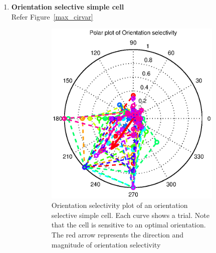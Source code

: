 \documentclass[11pt]{article}
\newcommand{\rulesep}{\unskip\ \vrule\ }
\begin{document}
\begin{enumerate}
    \item \textbf{Orientation selective simple cell}\\
    Refer Figure~\ref{max_cirvar}
    \begin{figure}
    \centering
    \caption{Orientation selective simple cell}
    \label{max_cirvar}
    \begin{subfigure}{.48\textwidth}
        \centering
        \includegraphics[width=\linewidth]{plots/max_cirvar_ori}
        \caption{Orientation selectivity plot of an orientation selective simple cell. Each curve shows a trial. Note that the cell is sensitive to an optimal orientation. The red arrow represents the direction and magnitude of orientation selectivity}
    \end{subfigure}
    \rulesep
    \begin{subfigure}{.48\textwidth}
        \centering

\end{subfigure}
\end{figure}
\end{enumerate}
\end{document}
